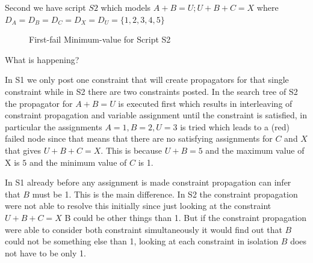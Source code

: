 \documentclass[a4paper, 11pt]{article}
\begin{document}
Second we have script $S2$ which models $A+B = U; U+B+C = X$ where $D_A = D_B = D_C = D_X = D_U = \{1,2,3,4,5\}$
\begin{figure}[H]
  \begin{center}
    \caption{First-fail Minimum-value for Script S2}
    \label{fig:ffvms2}
  \end{center}
\end{figure}

What is happening?

In S1 we only post one constraint that will create propagators for that single constraint while in S2 there are two constraints posted. In the search tree of S2 the propagator for $A + B = U$ is executed first which results in interleaving of constraint propagation and variable assignment until the constraint is satisfied, in particular the assignments $A = 1, B = 2, U = 3$ is tried which leads to a (red) failed node since that means that there are no satisfying assignments for $C$ and $X$ that gives $U+B+C = X$. This is because $U+B=5$ and the maximum value of X is $5$ and the minimum value of $C$ is 1.

In S1 already before any assignment is made constraint propagation can infer that $B$ must be 1. This is the main difference. In S2 the constraint propagation were not able to resolve this initially since just looking at the constraint $U+B+C=X$ B could be other things than 1. But if the constraint propagation were able to consider both constraint simultaneously it would find out that $B$ could not be something else than 1, looking at each constraint in isolation $B$ does not have to be only 1.
\end{document}
